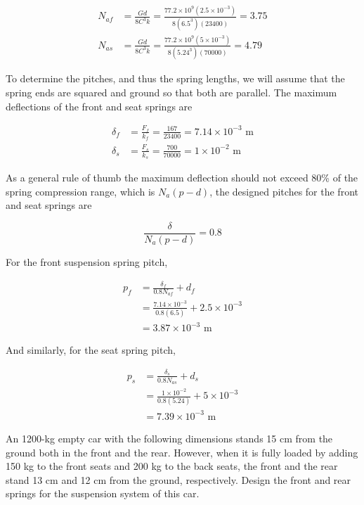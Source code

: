 \documentclass[a4paper,openany,12pt]{book}
\begin{document}
{{$$\begin{aligned}
    N_{af} &= \frac{Gd}{8C^3k} = \frac{77.2 \times 10^9(2.5 \times 10^{-3})}{8(6.5^3)(23400)} = 3.75 \\
    N_{as} &= \frac{Gd}{8C^3k} = \frac{77.2 \times 10^9(5 \times 10^{-3})}{8(5.24^3)(70000)} = 4.79
  \end{aligned}$$

To determine the pitches, and thus the spring lengths, we will assume
that the spring ends are squared and ground so that both are parallel.
The maximum deflections of the front and seat springs are

$$\begin{aligned}
    \delta_f &= \frac{F_f}{k_f} = \frac{167}{23400} = 7.14 \times 10^{-3} \text{ m} \\
    \delta_s &= \frac{F_s}{k_s} = \frac{700}{70000} = 1 \times 10^{-2}\text{ m}
  \end{aligned}$$

As a general rule of thumb the maximum deflection should not exceed 80\%
of the spring compression range, which is \(N_a(p - d)\), the designed
pitches for the front and seat springs are

$$\frac{\delta}{N_a(p - d)} = 0.8$$

For the front suspension spring pitch,

$$\begin{aligned}
    p_f &= \frac{\delta _f}{0.8N_{af}} + d_f \\ 
          &= \frac{7.14 \times 10^{-3}}{0.8(6.5)} + 2.5 \times 10^{-3} \\ 
          &= 3.87 \times 10^{-3} \text{ m}
  \end{aligned}$$

And similarly, for the seat spring pitch,

$$\begin{aligned}
    p_s &= \frac{\delta _s}{0.8N_{as}} + d_s \\ 
          &= \frac{1 \times 10^{-2}}{0.8(5.24)} + 5 \times 10^{-3} \\ 
          &= 7.39 \times 10^{-3}\text{ m}
  \end{aligned}$$

An 1200-kg empty car with the following dimensions stands 15 cm from the
ground both in the front and the rear. However, when it is fully loaded
by adding 150 kg to the front seats and 200 kg to the back seats, the
front and the rear stand 13 cm and 12 cm from the ground, respectively.
Design the front and rear springs for the suspension system of this car.

}}
\end{document}
